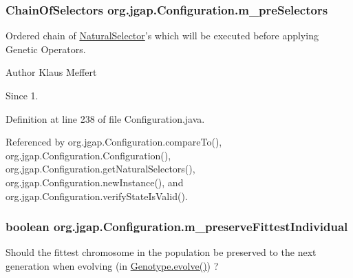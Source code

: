 \hypertarget{classorg_1_1jgap_1_1_configuration_a9ff1c9baa4657e597fdb86e4ae55c3aa}{
\subsubsection[{m\-\_\-pre\-Selectors}]{\setlength{\rightskip}{0pt plus 5cm}Chain\-Of\-Selectors org.\-jgap.\-Configuration.\-m\-\_\-pre\-Selectors\hspace{0.3cm}{\ttfamily [private]}}}\label{classorg_1_1jgap_1_1_configuration_a9ff1c9baa4657e597fdb86e4ae55c3aa}
Ordered chain of \hyperlink{classorg_1_1jgap_1_1_natural_selector}{Natural\-Selector}'s which will be executed before applying Genetic Operators.

\begin{DoxyAuthor}{Author}
Klaus Meffert 
\end{DoxyAuthor}
\begin{DoxySince}{Since}
1. 
\end{DoxySince}


Definition at line 238 of file Configuration.\-java.



Referenced by org.\-jgap.\-Configuration.\-compare\-To(), org.\-jgap.\-Configuration.\-Configuration(), org.\-jgap.\-Configuration.\-get\-Natural\-Selectors(), org.\-jgap.\-Configuration.\-new\-Instance(), and org.\-jgap.\-Configuration.\-verify\-State\-Is\-Valid().

\hypertarget{classorg_1_1jgap_1_1_configuration_acf752896310c978f999d484562ca3f07}{
\subsubsection[{m\-\_\-preserve\-Fittest\-Individual}]{\setlength{\rightskip}{0pt plus 5cm}boolean org.\-jgap.\-Configuration.\-m\-\_\-preserve\-Fittest\-Individual\hspace{0.3cm}{\ttfamily [private]}}}\label{classorg_1_1jgap_1_1_configuration_acf752896310c978f999d484562ca3f07}
Should the fittest chromosome in the population be preserved to the next generation when evolving (in \hyperlink{classorg_1_1jgap_1_1_genotype_a54a6791fbb6e13920e79f4e2dd719eb4}{Genotype.\-evolve()}) ? 


